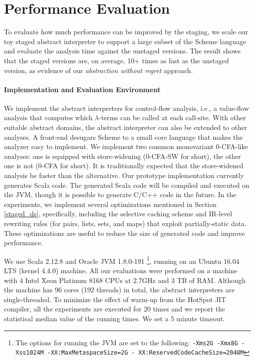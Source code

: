 \section{Performance Evaluation} \label{evaluation}

To evaluate how much performance can be improved by the staging, we scale our
toy staged abstract interpreter to support a large subset of the Scheme language and evaluate
the analysis time against the unstaged versions. The result shows that the
staged versions are, on average, 10+ times as fast as the unstaged version, as
evidence of our \textit{abstraction without regret} approach.

\vspace{-5pt}
\paragraph{Implementation and Evaluation Environment} We implement the abstract
interpreters for control-flow analysis, i.e., a value-flow analysis that
computes which $\lambda$-terms can be called at each call-site.
With other suitable abstract domains, the abstract interpreter
can also be extended to other analyses.
A front-end desugars Scheme to a small core language that makes the analyzer
easy to implement. We implement two common monovariant 0-CFA-like analyses: one
is equipped with store-widening (0-CFA-SW for short), the other one is not (0-CFA
for short). It is traditionally expected that the store-widened analysis be faster than the
alternative.  Our prototype implementation currently generates Scala code. The
generated Scala code will be compiled and executed on the JVM, though it is possible to
generate C/C++ code in the future. In the experiments, we implement several
optimizations mentioned in Section \ref{staged_ds}, specifically, including the
selective caching scheme and IR-level rewriting rules (for pairs, lists, sets,
and maps) that exploit partially-static data. These optimizations are useful to
reduce the size of generated code and improve performance.

We use Scala 2.12.8 and Oracle JVM 1.8.0-191 \footnote{The options for
running the JVM are set to the following: \texttt{-Xms2G -Xmx8G -Xss1024M
-XX:MaxMetaspaceSize=2G - XX:ReservedCodeCacheSize=2048M}},
running on an Ubuntu 16.04 LTS (kernel 4.4.0) machine. All our
evaluations were performed on a machine with 4 Intel Xeon Platinum
8168 CPUs at 2.7GHz and 3 TB of RAM. Although the machine has 96 cores
(192 threads) in total, the abstract interpreters are single-threaded.
To minimize the effect of warm-up from the HotSpot JIT compiler,
all the experiments are executed for 20 times and we report the
statistical median value of the running times. We set a 5 minute
timeout.

